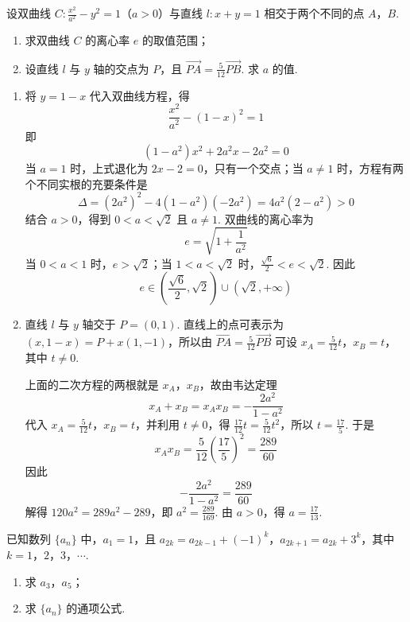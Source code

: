 \begin{problem}
设双曲线 \(C: \frac{x^2}{a^2} - y^2 = 1\)（\(a > 0\)）与直线 \(l: x + y = 1\) 相交于两个不同的点 \(A\)，\(B\).

\begin{enumerate}
\item 求双曲线 \(C\) 的离心率 \(e\) 的取值范围；
\item 设直线 \(l\) 与 \(y\) 轴的交点为 \(P\)，且 \(\overrightarrow{PA} = \frac{5}{12}\overrightarrow{PB}\). 求 \(a\) 的值.
\end{enumerate}
\end{problem}

\begin{solution}
\begin{enumerate}
\item 将 \(y=1-x\) 代入双曲线方程，得
\[
\frac{x^2}{a^2}-(1-x)^2=1
\]
即
\[
(1-a^2)x^2+2a^2x-2a^2=0
\]
当 \(a=1\) 时，上式退化为 \(2x-2=0\)，只有一个交点；当 \(a\ne1\) 时，方程有两个不同实根的充要条件是
\[
\Delta=(2a^2)^2-4(1-a^2)(-2a^2)=4a^2(2-a^2)>0
\]
结合 \(a>0\)，得到 \(0<a<\sqrt2\) 且 \(a\ne1\). 双曲线的离心率为
\[
e=\sqrt{1+\frac{1}{a^2}}
\]
当 \(0<a<1\) 时，\(e>\sqrt2\)；当 \(1<a<\sqrt2\) 时，\(\frac{\sqrt6}{2}<e<\sqrt2\). 因此
\[
e\in\left(\frac{\sqrt6}{2},\sqrt2\right)\cup\left(\sqrt2,+\infty\right)
\]

\item 直线 \(l\) 与 \(y\) 轴交于 \(P=(0,1)\). 直线上的点可表示为 \((x,1-x)=P+x(1,-1)\)，所以由 \(\overrightarrow{PA}=\frac5{12}\overrightarrow{PB}\) 可设 \(x_A=\frac5{12}t\)，\(x_B=t\)，其中 \(t\ne0\).

上面的二次方程的两根就是 \(x_A\)，\(x_B\)，故由韦达定理
\[
x_A+x_B=x_Ax_B=-\frac{2a^2}{1-a^2}
\]
代入 \(x_A=\frac{5}{12}t\)，\(x_B=t\)，并利用 \(t\ne0\)，得 \(\frac{17}{12}t=\frac5{12}t^2\)，所以 \(t=\frac{17}{5}\). 于是
\[
x_Ax_B=\frac5{12}\left(\frac{17}{5}\right)^2=\frac{289}{60}
\]
因此
\[
-\frac{2a^2}{1-a^2}=\frac{289}{60}
\]
解得 \(120a^2=289a^2-289\)，即 \(a^2=\frac{289}{169}\). 由 \(a>0\)，得 \(a=\frac{17}{13}\).
\end{enumerate}
\end{solution}

\begin{problem}
已知数列 \(\{a_n\}\) 中，\(a_1 = 1\)，且 \(a_{2k} = a_{2k-1} + (-1)^k\)，\(a_{2k+1} = a_{2k} + 3^k\)，其中 \(k = 1\)，\(2\)，\(3\)，\(\cdots\).

\begin{enumerate}
\item 求 \(a_{3}\)，\(a_{5}\)；
\item 求 \(\{a_n\}\) 的通项公式.
\end{enumerate}
\end{problem}

